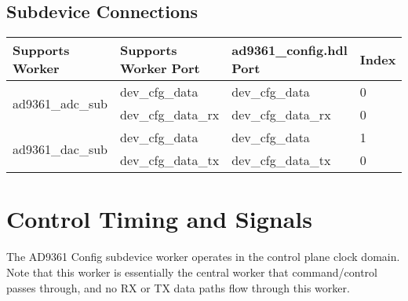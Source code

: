 \documentclass{article}
\def\comp{ad9361\_config}
\def\Comp{AD9361 Config}
\begin{document}
\begin{landscape}
  \section{Subdevice Connections}
  \begin{scriptsize}
    \begin{tabular}{|p{5cm}|p{5cm}|p{5cm}|p{7.22cm}|}
      \hline
      \rowcolor{blue}
      Supports Worker  & Supports Worker Port & \comp{}.hdl Port   & Index \\
      \hline
      \multirow{2}{*}{ad9361\_adc\_sub} & dev\_cfg\_data       & dev\_cfg\_data     &0 \\
                       & dev\_cfg\_data\_rx   & dev\_cfg\_data\_rx &0 \\
      \hline
      \multirow{2}{*}{ad9361\_dac\_sub} & dev\_cfg\_data       & dev\_cfg\_data     &1 \\
                       & dev\_cfg\_data\_tx   & dev\_cfg\_data\_tx &0 \\
      \hline
    \end{tabular}
  \end{scriptsize}

\end{landscape}

\section{Control Timing and Signals}
The \Comp{} subdevice worker operates in the control plane clock domain. Note that this worker is essentially the central worker that command/control passes through, and no RX or TX data paths flow through this worker.
\end{document}
